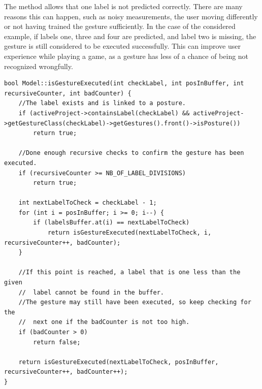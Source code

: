 The method allows that one label is not predicted correctly. There are many reasons this can happen, such as noisy measurements, the user moving differently or not having trained the gesture sufficiently. In the case of the considered example, if labels one, three and four are predicted, and label two is missing, the gesture is still considered to be executed successfully. This can improve user experience while playing a game, as a gesture has less of a chance of being not recognized wrongfully.\\

\begin{lstlisting}[caption=method to verify if a gesture with given label is executed, label=code_gesture_executed]
bool Model::isGestureExecuted(int checkLabel, int posInBuffer, int recursiveCounter, int badCounter) {
	//The label exists and is linked to a posture.
	if (activeProject->containsLabel(checkLabel) && activeProject->getGestureClass(checkLabel)->getGestures().front()->isPosture())
		return true;

	//Done enough recursive checks to confirm the gesture has been executed.
	if (recursiveCounter >= NB_OF_LABEL_DIVISIONS)
		return true;

	int nextLabelToCheck = checkLabel - 1;
	for (int i = posInBuffer; i >= 0; i--) {
		if (labelsBuffer.at(i) == nextLabelToCheck)
			return isGestureExecuted(nextLabelToCheck, i, recursiveCounter++, badCounter);
	}

	//If this point is reached, a label that is one less than the given
	//	label cannot be found in the buffer.
	//The gesture may still have been executed, so keep checking for the
	//	next one if the badCounter is not too high.
	if (badCounter > 0)
		return false;
		
	return isGestureExecuted(nextLabelToCheck, posInBuffer, recursiveCounter++, badCounter++);
}
\end{lstlisting}